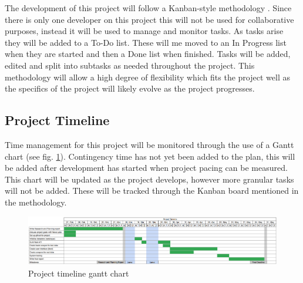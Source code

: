 \documentclass[12pt,titlepage]{article}
\begin{document}
  The development of this project will follow a Kanban-style methodology
  \cite{kanban}. Since there is only one developer on this project this will not
  be used for collaborative purposes, instead it will be used to manage and
  monitor tasks. As tasks arise they will be added to a To-Do list. These will
  me moved to an In Progress list when they are started and then a Done list
  when finished. Tasks will be added, edited and split into subtasks as needed
  throughout the project. This methodology will allow a high degree of
  flexibility which fits the project well as the specifics of the project will
  likely evolve as the project progresses.

  \subsection{Project Timeline}

  Time management for this project will be monitored through the use of a Gantt
  chart (see fig. \ref{fig:gantt}). Contingency time has not yet been added to
  the plan, this will be added after development has started when project pacing
  can be measured. This chart will be updated as the project develops, however
  more granular tasks will not be added. These will be tracked through the
  Kanban board mentioned in the methodology.

  \clearpage

  \begin{figure}
    \includegraphics[width=\textheight]{../img/gantt.png}
    \caption{Project timeline gantt chart}
    \label{fig:gantt}
  \end{figure}

  \clearpage


\end{document}
